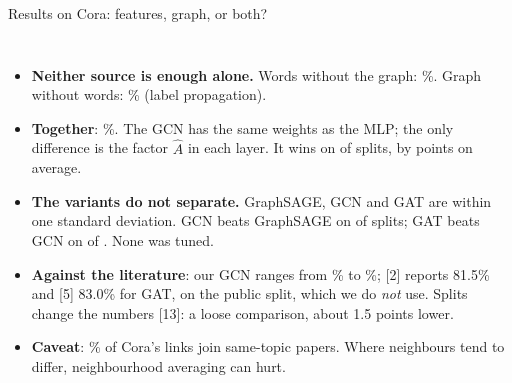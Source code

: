\documentclass[aspectratio=169,10pt]{beamer}
\renewcommand{\cite}[1]{{\scriptsize\color{cTok}[#1]}}
\newcommand{\Ah}{\hat A}
\begin{document}
\begin{frame}{Results on Cora: features, graph, or both?}
\begin{columns}[T,onlytextwidth]
\vspace{0.5mm}
\begin{itemize}\footnotesize
  \item \textbf{Neither source is enough alone.} Words without the graph: \coraMlpMean\%.
        Graph without words: \coraLpMean\% (label propagation).
  \item \textbf{Together}: \coraGcnMean\%. The GCN has the same \coraGcnParams{} weights as the MLP;
        the only difference is the factor $\Ah$ in each layer. It wins on \gcnBeatsMlp{} of \coraSeeds{} splits,
        by \gcnMinusMlp{} points on average.
  \item \textbf{The variants do not separate.} GraphSAGE, GCN and GAT are within one standard deviation.
        GCN beats GraphSAGE on \gcnBeatsSage{} of \coraSeeds{} splits; GAT beats GCN on
        \gatBeatsGcn{} of \coraGatSeeds. None was tuned.
  \item \textbf{Against the literature}: our GCN ranges from \coraGcnMin\% to \coraGcnMax\%; \cite{2}
        reports 81.5\% and \cite{5} 83.0\% for GAT, on the public split, which we do \emph{not} use.
        Splits change the numbers \cite{13}: a loose comparison, about 1.5 points lower.
  \item \textbf{Caveat}: \coraHomophily\% of Cora's links join same-topic papers. Where neighbours tend to
        differ, neighbourhood averaging can hurt.
\end{itemize}
\end{columns}
\end{frame}
\end{document}

